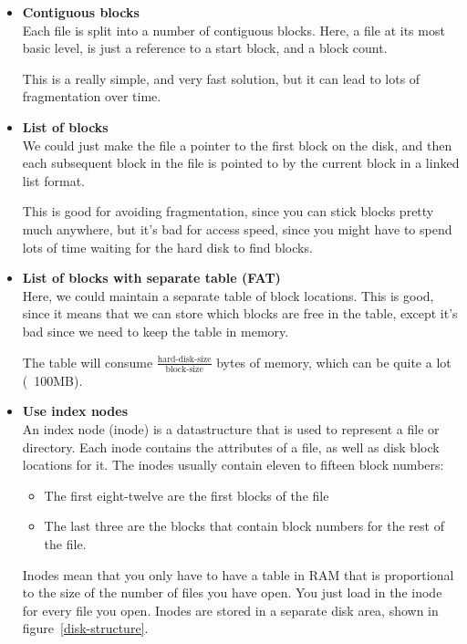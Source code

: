 \begin{itemize}
  \item \textbf{Contiguous blocks}\\
    Each file is split into a number of contiguous blocks. Here, a file at its
    most basic level, is just a reference to a start block, and a block count.

    This is a really simple, and very fast solution, but it can lead to lots
    of fragmentation over time.
  \item \textbf{List of blocks}\\
    We could just make the file a pointer to the first block on the disk, and
    then each subsequent block in the file is pointed to by the current block
    in a linked list format.

    This is good for avoiding fragmentation, since you can stick blocks pretty 
    much anywhere, but it's bad for access speed, since you might have to
    spend lots of time waiting for the hard disk to find blocks.
  \item \textbf{List of blocks with separate table (FAT)}\\
    Here, we could maintain a separate table of block locations. This is good,
    since it means that we can store which blocks are free in the table,
    except it's bad since we need to keep the table in memory.

    The table will consume $\frac{\text{hard-disk-size}}{\text{block-size}}$
    bytes of memory, which can be quite a lot (~100MB).
  \item \textbf{Use index nodes}\\
    An index node (inode) is a datastructure that is used to represent a file
    or directory. Each inode contains the attributes of a file, as well as
    disk block locations for it. The inodes usually contain eleven to fifteen
    block numbers:
    \begin{itemize}
      \item The first eight-twelve are the first blocks of the file
      \item The last three are the blocks that contain block numbers for the
        rest of the file.
    \end{itemize}

    Inodes mean that you only have to have a table in RAM that is proportional
    to the size of the number of files you have open. You just load in the
    inode for every file you open. Inodes are stored in a separate disk area,
    shown in figure~\ref{disk-structure}.
\end{itemize}

